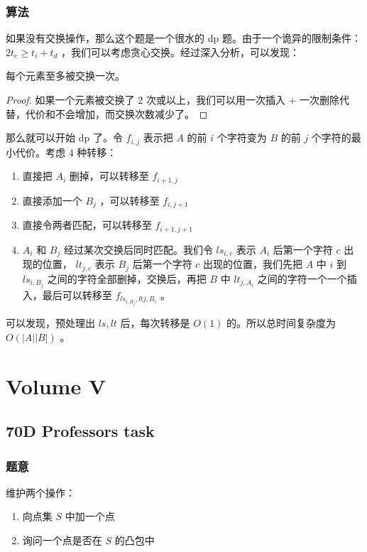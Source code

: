 \documentclass[11pt]{article}
\begin{document}
\subsubsection{算法}
\label{sec-4-9-2}

    如果没有交换操作，那么这个题是一个很水的 dp 题。由于一个诡异的限制条件： $2 t_e \geq t_i + t_d$ ，我们可以考虑贪心交换。经过深入分析，可以发现：
\begin{theorem}
  每个元素至多被交换一次。
\end{theorem}
\begin{proof}
  如果一个元素被交换了 2 次或以上，我们可以用一次插入 + 一次删除代替，代价和不会增加，而交换次数减少了。
\end{proof}

    那么就可以开始 dp 了。令 $f_{i, j}$ 表示把 $A$ 的前 $i$ 个字符变为 $B$ 的前 $j$ 个字符的最小代价。考虑 4 种转移：
\begin{enumerate}
\item 直接把 $A_i$ 删掉，可以转移至 $f_{i + 1, j}$
\item 直接添加一个 $B_j$ ，可以转移至 $f_{i, j + 1}$
\item 直接令两者匹配，可以转移至 $f_{i + 1, j+ 1}$
\item $A_i$ 和 $B_j$ 经过某次交换后同时匹配。我们令 $ls_{i, c}$ 表示 $A_i$ 后第一个字符 $c$ 出现的位置， $lt_{j, c}$ 表示 $B_j$ 后第一个字符 $c$ 出现的位置，我们先把 $A$ 中 $i$ 到 $ls_{i, B_j}$ 之间的字符全部删掉，交换后，再把 $B$ 中 $lt_{j, A_i}$ 之间的字符一个一个插入，最后可以转移至 $f_{ls_{i, B_j}, lt{j, B_i}}$ 。
\end{enumerate}

   可以发现，预处理出 $ls, lt$ 后，每次转移是 $O(1)$ 的。所以总时间复杂度为 $O(|A||B|)$ 。
\section{Volume V}
\label{sec-5}
\subsection{70D   Professors task}
\label{sec-5-1}
\subsubsection{题意}
\label{sec-5-1-1}

    维护两个操作：
\begin{enumerate}
\item 向点集 $S$ 中加一个点
\item 询问一个点是否在 $S$ 的凸包中
\end{enumerate}
\end{document}
